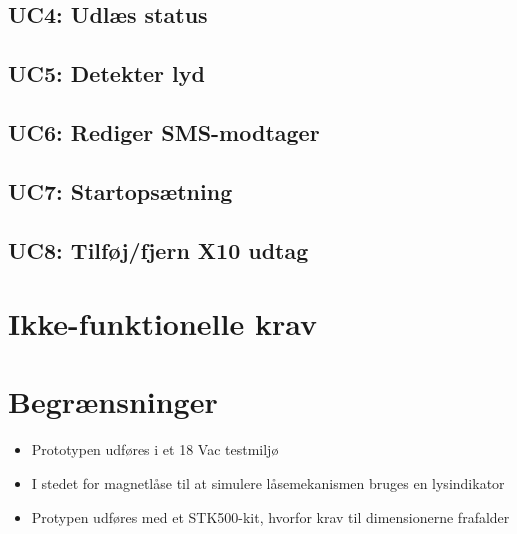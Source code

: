 
\subsection{UC4: Udlæs status}



\subsection{UC5: Detekter lyd}



\subsection{UC6: Rediger SMS-modtager}



\subsection{UC7: Startopsætning}



\subsection{UC8: Tilføj/fjern X10 udtag}



\section{Ikke-funktionelle krav}



\section{Begrænsninger} \label{sectionBegraensninger}
\begin{itemize}
	\item Prototypen udføres i et 18 Vac testmiljø
	\item I stedet for magnetlåse til at simulere låsemekanismen bruges en lysindikator
	\item Protypen udføres med et STK500-kit, hvorfor krav til dimensionerne frafalder
\end{itemize}

